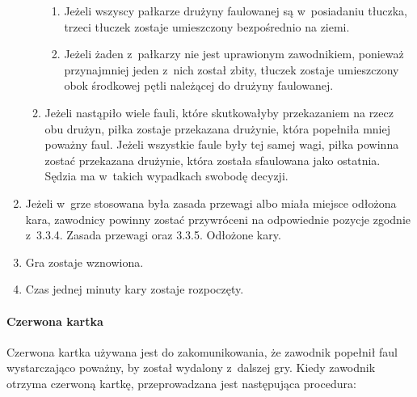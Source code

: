\documentclass[12pt,a4paper]{article}
\begin{document}
\begin{enumerate}
\begin{enumerate}
		            \begin{enumerate}
			            \item
			                  Jeżeli wszyscy pałkarze drużyny faulowanej są w~posiadaniu
			                  tłuczka, trzeci tłuczek zostaje umieszczony bezpośrednio na ziemi.
			            \item
			                  Jeżeli żaden z~pałkarzy nie jest uprawionym zawodnikiem, ponieważ
			                  przynajmniej jeden z~nich został zbity, tłuczek zostaje
			                  umieszczony obok środkowej pętli należącej do drużyny faulowanej.
		            \end{enumerate}
		      \item
		            Jeżeli nastąpiło wiele fauli, które skutkowałyby przekazaniem na
		            rzecz obu drużyn, piłka zostaje przekazana drużynie, która popełniła
		            mniej poważny faul. Jeżeli wszystkie faule były tej samej wagi,
		            piłka powinna zostać przekazana drużynie, która została sfaulowana
		            jako ostatnia. Sędzia ma w~takich wypadkach swobodę decyzji.
	      \end{enumerate}
	\item
	      Jeżeli w~grze stosowana była zasada przewagi albo miała miejsce
	      odłożona kara, zawodnicy powinny zostać przywróceni na odpowiednie
	      pozycje zgodnie z~3.3.4. Zasada przewagi oraz 3.3.5. Odłożone kary.
	\item
	      Gra zostaje wznowiona.
	\item
	      Czas jednej minuty kary zostaje rozpoczęty.
\end{enumerate}

\paragraph{Czerwona kartka}
Czerwona kartka używana jest do
zakomunikowania, że zawodnik popełnił faul wystarczająco poważny, by
został wydalony z~dalszej gry. Kiedy zawodnik otrzyma czerwoną kartkę,
przeprowadzana jest następująca procedura:
\end{document}
